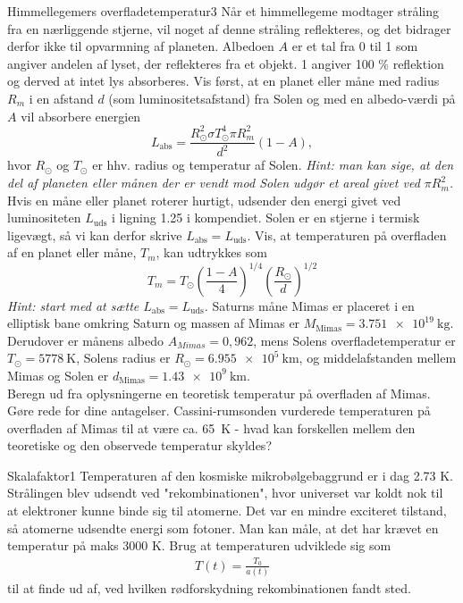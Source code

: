 \begin{opgave}{Himmellegemers overfladetemperatur}{3}
	Når et himmellegeme modtager stråling fra en nærliggende stjerne, vil noget af denne stråling reflekteres, og det bidrager derfor ikke til opvarmning af planeten. Albedoen $A$ er et tal fra 0 til 1 som angiver andelen af lyset, der reflekteres fra et objekt. 1 angiver 100 \% reflektion og derved at intet lys absorberes.
	\opg Vis først, at en planet eller måne med
	radius $R_m$ i en afstand $d$ (som luminositetsafstand) fra Solen og med en albedo-værdi på
	$A$ vil absorbere energien
	\begin{equation}
	L_\text{abs} = \frac{R_\odot^2\sigma T_\odot^4 \pi R_m^2}{d^2} \left( 1 - A \right),
	\end{equation}
	hvor $R_\odot$ og $T_\odot$ er hhv. radius og temperatur af Solen. \emph{Hint: man kan sige, at den del af planeten eller månen der er vendt mod Solen udgør et areal givet ved $\pi R_m^2$.} 
	\opg Hvis en måne eller planet roterer hurtigt, udsender den energi givet ved luminositeten $L_\text{uds}$ i ligning 1.25 i kompendiet. Solen er en stjerne i termisk ligevægt, så vi kan derfor skrive $L_\text{abs}=L_\text{uds}$. Vis, at temperaturen på overfladen af en planet eller måne, $T_m$, kan udtrykkes som
	\begin{equation}
	T_m = T_\odot \left( \frac{1-A}{4} \right)^{1/4} \left(\frac{R_\odot}{d} \right)^{1/2}
	\end{equation}
	\emph{Hint: start med at sætte $L_\text{abs}=L_\text{uds}$.} 
	\opg Saturns måne Mimas er placeret i en elliptisk bane omkring Saturn og  massen af Mimas er $M_\text{Mimas} = \SI{3,751e19}{\kilo\gram}$. Derudover er månens albedo $A_{Mimas} = 0,962$, mens Solens overfladetemperatur er $T_\odot = \SI{5778}{\kelvin}$, Solens radius er $R_\odot = \SI{6,955e5}{\kilo\metre}$, og middelafstanden mellem Mimas og Solen er $d_{\text{Mimas}} = \SI{1,43e9}{\kilo\metre}$. \\
	Beregn ud fra oplysningerne en teoretisk temperatur på overfladen af Mimas. Gøre rede for dine antagelser.
	\opg Cassini-rumsonden vurderede temperaturen på overfladen af Mimas til at være ca. \SI{65}{\kelvin} - hvad kan forskellen mellem den teoretiske og den observede temperatur skyldes?
\end{opgave}
\begin{opgave}{Skalafaktor}{1}
	Temperaturen af den kosmiske mikrobølgebaggrund er i dag 2.73 K. Strålingen blev udsendt ved "rekombinationen", hvor universet var koldt nok til at elektroner kunne binde sig til atomerne. Det var en mindre exciteret tilstand, så atomerne udsendte energi som fotoner. Man kan måle, at det har krævet en temperatur på maks 3000 K. Brug at temperaturen udviklede sig som
	\begin{align}
		T(t)=\frac{T_0}{a(t)}
	\end{align}
	til at finde ud af, ved hvilken rødforskydning rekombinationen fandt sted.
\end{opgave}

